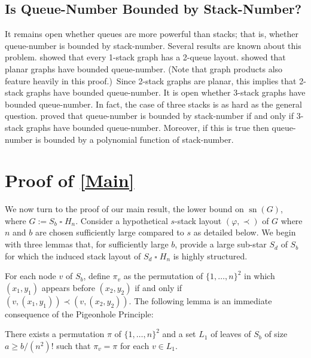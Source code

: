 \documentclass[kpfonts]{patmorin}
\DeclareMathOperator{\sn}{sn}
\renewcommand{\ge}{\geqslant}
\newcommand{\CartProd}{\mathbin{\square}}
\begin{document}

\subsection*{Is Queue-Number Bounded by Stack-Number? }

It remains open whether queues are more powerful than stacks; that is, whether queue-number is bounded by stack-number. Several results are known about this problem. \citet{HLR92} showed that every 1-stack graph has a 2-queue layout. \citet{DJMMUW20} showed that planar graphs have bounded queue-number. (Note that graph products also feature heavily in this proof.)\ Since 2-stack graphs are planar, this implies that 2-stack graphs have bounded queue-number. It is open whether 3-stack graphs have bounded queue-number. In fact, the case of three stacks is as hard as the general question. \citet{DujWoo05} proved that queue-number is bounded by stack-number if and only if 3-stack graphs have bounded queue-number. Moreover, if this is true then queue-number is bounded by a polynomial function of stack-number.



\section{Proof of \cref{Main}}

We now turn to the proof of our main result, the lower bound on $\sn(G)$, where $G:= S_b\CartProd H_n$. Consider a hypothetical $s$-stack layout $(\varphi,\prec)$ of $G$ where $n$ and $b$ are chosen sufficiently large compared to $s$ as detailed below. We begin with three lemmas that, for sufficiently large $b$, provide a large sub-star $S_d$ of $S_b$ for which the induced stack layout of $S_d\CartProd H_n$ is highly structured.

For each node $v$ of $S_b$, define $\pi_v$ as the permutation of $\{1,\ldots,n\}^2$ in which $(x_1,y_1)$ appears before $(x_2,y_2)$ if and only if $(v,(x_1,y_1))\prec (v,(x_2,y_2))$. The following lemma is an immediate consequence of the Pigeonhole Principle:

\begin{lem}\label{uniform_order}
    There exists a permutation $\pi$ of $\{1,\ldots,n\}^2$ and a set $L_1$ of leaves of $S_b$ of size $a\ge b/(n^2)!$ such that $\pi_{v}=\pi$ for each $v\in L_1$.
\end{lem}
\end{document}
